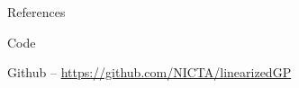 \documentclass[final]{beamer}
\newlength{\onecolwid}
\begin{document}
\begin{frame}[t]
\begin{columns}[t]
\begin{column}{\onecolwid}

\begin{block}{References}

\small{
\vspace{0.75in}}

\end{block}









\vspace{-2cm}
\begin{alertblock}{Code}

Github -- \href{https://github.com/NICTA/linearizedGP}
                 {https://github.com/NICTA/linearizedGP}
\end{alertblock}


\end{column} %

\end{columns} %

\end{frame} %
\end{document}
